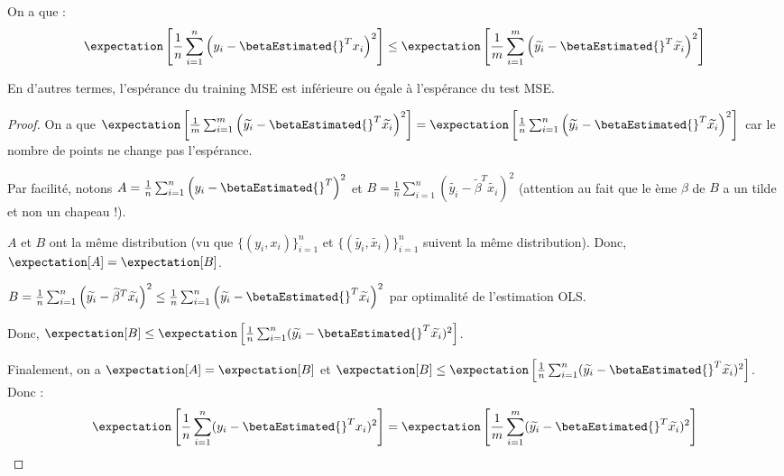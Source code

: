         \begin{theorem}
            On a que :
                \[
                    \expectation\left[\frac{1}{n}\sum_{i=1}^n \left(y_i - \betaEstimated{}^T x_i\right)^2\right] \leq \expectation\left[\frac{1}{m} \sum_{i=1}^m \left(\widetilde{y_i} - \betaEstimated{}^T \widetilde{x_i}\right)^2\right]
                \]

            En d'autres termes, l'espérance du training MSE est inférieure ou égale à l'espérance du test MSE.
        \end{theorem}
        \begin{proof}
            On a que \(\expectation\left[\frac{1}{m} \sum_{i=1}^m \left(\widetilde{y_i} - \betaEstimated{}^T \widetilde{x_i}\right)^2\right] = \expectation\left[\frac{1}{n} \sum_{i=1}^n \left(\widetilde{y_i} - \betaEstimated{}^T \widetilde{x_i}\right)^2\right]\) car le nombre de points ne change pas l'espérance.

            Par facilité, notons \(A = \frac{1}{n}\sum_{i=1}^n \left(y_i - \betaEstimated{}^T\right)^2\) et \(B = \frac{1}{n} \sum_{i=1}^n \left(\widetilde{y_i} - \widetilde{\beta}^T \widetilde{x_i}\right)^2\) (attention au fait que le ème \(\beta\) de \(B\) a un tilde et non un chapeau !).

            \(A\) et \(B\) ont la même distribution (vu que \(\{(y_i, x_i)\}_{i=1}^n\) et \(\{(\widetilde{y_i}, \widetilde{x_i})\}_{i=1}^n\) suivent la même distribution). Donc, \(\expectation[A] = \expectation[B]\).

            \(B = \frac{1}{n}\sum_{i=1}^n \left(\widetilde{y_i} - \widetilde{\beta}^T \widetilde{x_i}\right)^2 \leq \frac{1}{n} \sum_{i=1}^n \left(\widetilde{y_i} - \betaEstimated{}^T \widetilde{x_i}\right)^2\) par optimalité de l'estimation OLS.

            Donc, \(\expectation[B] \leq \expectation\left[\frac{1}{n} \sum_{i=1}^n (\widetilde{y_i} - \betaEstimated{}^T \widetilde{x_i})^2\right]\).

            Finalement, on a \(\expectation[A] = \expectation[B]\) et \(\expectation[B] \leq \expectation\left[\frac{1}{n} \sum_{i=1}^n (\widetilde{y_i} - \betaEstimated{}^T \widetilde{x_i})^2\right]\). Donc :
            \[
                \expectation\left[\frac{1}{n} \sum_{i=1}^n (y_i - \betaEstimated{}^T x_i)^2\right] = \expectation\left[\frac{1}{m} \sum_{i=1}^m (\widetilde{y_i} - \betaEstimated{}^T \widetilde{x_i})^2\right]
            \]
        \end{proof}

